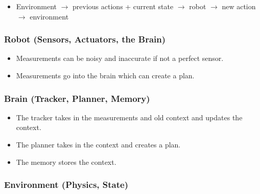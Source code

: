\begin{notes}
    \begin{itemize}
        \item Environment \(\rightarrow\) previous actions + current state \(\rightarrow\) robot \(\rightarrow\) new action \(\rightarrow\) environment
    \end{itemize}
\end{notes}

\subsubsection{Robot (Sensors, Actuators, the Brain)}
\begin{definition}
\end{definition}

\begin{notes}
    \begin{itemize}
        \item Measurements can be noisy and inaccurate if not a perfect sensor. 
        \item Measurements go into the brain which can create a plan.
    \end{itemize}
\end{notes}

\subsubsection{Brain (Tracker, Planner, Memory)}
\begin{definition}
\end{definition}

\begin{notes}
    \begin{itemize}
        \item The tracker takes in the measurements and old context and updates the context.
        \item The planner takes in the context and creates a plan.
        \item The memory stores the context.
    \end{itemize}
\end{notes}

\subsubsection{Environment (Physics, State)}
\begin{definition}
\end{definition}

